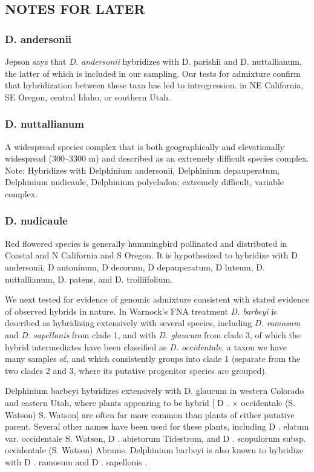 \documentclass[11pt]{article}
\begin{document}
\subsection{NOTES FOR LATER}

\subsubsection{D. andersonii}
Jepson says that \emph{D. andersonii} hybridizes with D. parishii and D. nuttallianum,
the latter of which is included in our sampling. Our tests for admixture confirm
that hybridization between these taxa has led to introgression.
in NE California, SE Oregon, central Idaho, or southern Utah. 


\subsubsection{D. nuttallianum}
A widespread species complex that is both geographically and elevationally widespread (300--3300 m) and 
described as an extremely difficult species complex. 
Note: Hybridizes with Delphinium andersonii, Delphinium depauperatum, Delphinium nudicaule, Delphinium polycladon; extremely difficult, variable complex.


\subsubsection{D. nudicaule}
Red flowered species is generally hummingbird pollinated and distributed in Coastal and N California and S Oregon. It is hypothesized to hybridize with D andersonii, D antoninum, D decorum, D depauperatum, D luteum, D. nuttallianum, D. patens, and D. trolliifolium. 


We next tested for evidence of genomic admixture consistent with stated evidence
of observed hybrids in nature. In Warnock's FNA treatment \emph{D. barbeyi} is 
described as hybridizing extensively with several species, including 
\emph{D. ramosum} and \emph{D. sapellonis} from clade 1, and with 
\emph{D. glaucum} from clade 3, of which the hybrid intermediates have been 
classified as \emph{D. occidentale}, a taxon we have many samples of, and
which consistently groups into clade 1 (separate from the two clades 2 and 3, 
where its putative progenitor species are grouped). 


Delphinium barbeyi hybridizes extensively with D. glaucum in western Colorado and eastern Utah, where plants appearing to be hybrid [ D . × occidentale (S. Watson) S. Watson] are often far more common than plants of either putative parent. Several other names have been used for these plants, including D . elatum var. occidentale S. Watson, D . abietorum Tidestrom, and D . scopulorum subsp. occidentale (S. Watson) Abrams. Delphinium barbeyi is also known to hybridize with D . ramosum and D . sapellonis .
\end{document}
